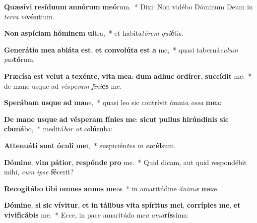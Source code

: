 \item \textbf{Quæ}\textbf{sí}\textbf{vi} \textbf{re}\textbf{sí}\textbf{du}\textbf{um} \textbf{an}\textbf{nó}\textbf{rum} \textbf{me}\textbf{ó}rum.~* Dixi: Non vidébo Dóminum Deum in \textit{ter}\textit{ra} \textit{vi}\textbf{vén}tium.
\item \textbf{Non} \textbf{a}\textbf{spí}\textbf{ci}\textbf{am} \textbf{hó}\textbf{mi}\textbf{nem} \textbf{ul}tra,~* et habita\textit{tó}\textit{rem} \textit{qui}\textbf{é}tis.
\item \textbf{Ge}\textbf{ne}\textbf{rá}\textbf{ti}\textbf{o} \textbf{me}\textbf{a} \textbf{ab}\textbf{lá}\textbf{ta} \textbf{est}, \textbf{et} \textbf{con}\textbf{vo}\textbf{lú}\textbf{ta} \textbf{est} \textbf{a} me,~* quasi taberná\textit{cu}\textit{lum} \textit{pas}\textbf{tó}rum.
\item \textbf{Præ}\textbf{cí}\textbf{sa} \textbf{est} \textbf{vel}\textbf{ut} \textbf{a} \textbf{te}\textbf{xén}\textbf{te}, \textbf{vi}\textbf{ta} \textbf{me}\textbf{a}: \textbf{dum} \textbf{ad}\textbf{huc} \textbf{or}\textbf{dí}\textbf{rer}, \textbf{suc}\textbf{cí}\textbf{dit} me:~* de mane usque ad véspe\textit{ram} \textit{fí}\textit{ni}\textbf{es} me.
\item \textbf{Spe}\textbf{rá}\textbf{bam} \textbf{us}\textbf{que} \textbf{ad} \textbf{ma}ne,~* quasi leo sic contrívit ómni\textit{a} \textit{os}\textit{sa} \textbf{me}a:
\item \textbf{De} \textbf{ma}\textbf{ne} \textbf{us}\textbf{que} \textbf{ad} \textbf{vés}\textbf{pe}\textbf{ram} \textbf{fí}\textbf{ni}\textbf{es} \textbf{me}: \textbf{sic}\textbf{ut} \textbf{pul}\textbf{lus} \textbf{hi}\textbf{rún}\textbf{di}\textbf{nis} \textbf{sic} \textbf{cla}\textbf{má}bo,~* meditá\textit{bor} \textit{ut} \textit{co}\textbf{lúm}ba:
\item \textbf{At}\textbf{te}\textbf{nu}\textbf{á}\textbf{ti} \textbf{sunt} \textbf{ó}\textbf{cu}\textbf{li} \textbf{me}i,~* suspicién\textit{tes} \textit{in} \textit{ex}\textbf{cél}sum.
\item \textbf{Dó}\textbf{mi}\textbf{ne}, \textbf{vim} \textbf{pá}\textbf{ti}\textbf{or}, \textbf{re}\textbf{spón}\textbf{de} \textbf{pro} me.~* Quid dicam, aut quid respondébit mihi, \textit{cum} \textit{ip}\textit{se} \textbf{fé}cerit?
\item \textbf{Re}\textbf{co}\textbf{gi}\textbf{tá}\textbf{bo} \textbf{ti}\textbf{bi} \textbf{om}\textbf{nes} \textbf{an}\textbf{nos} \textbf{me}os~* in amaritúdine \textit{á}\textit{ni}\textit{mæ} \textbf{me}æ.
\item \textbf{Dó}\textbf{mi}\textbf{ne}, \textbf{si} \textbf{sic} \textbf{ví}\textbf{vi}\textbf{tur}, \textbf{et} \textbf{in} \textbf{tá}\textbf{li}\textbf{bus} \textbf{vi}\textbf{ta} \textbf{spí}\textbf{ri}\textbf{tus} \textbf{me}\textbf{i}, \textbf{cor}\textbf{rí}\textbf{pi}\textbf{es} \textbf{me}, \textbf{et} \textbf{vi}\textbf{vi}\textbf{fi}\textbf{cá}\textbf{bis} me.~* Ecce, in pace amaritúdo me\textit{a} \textit{a}\textit{ma}\textbf{rís}sima:
